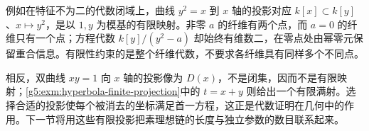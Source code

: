 例如在特征不为二的代数闭域上，曲线 \(y^2=x\) 到 \(x\) 轴的投影对应
\(k[x]\subset k[y]\)、\(x\mapsto y^2\)，是以 \(1,y\) 为模基的有限映射。非零 \(a\) 的纤维有两个点，而 \(a=0\) 的纤维只有一个点；方程代数
\(k[y]/(y^2-a)\) 却始终有维数二，在零点处由幂零元保留重合信息。有限性约束的是整个纤维代数，不要求各纤维具有同样多个不同点。

\ProseParagraphBreak

相反，双曲线 \(xy=1\) 向 \(x\) 轴的投影像为 \(D(x)\)，不是闭集，因而不是有限映射；\cref{g5:exm:hyperbola-finite-projection}中的 \(t=x+y\) 则给出一个有限满射。选择合适的投影使每个被消去的坐标满足首一方程，这正是代数证明在几何中的作用。下一节将用这些有限投影把素理想链的长度与独立参数的数目联系起来。

